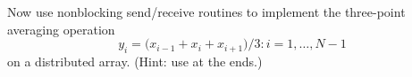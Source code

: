   \label{ex:3ptnonblock}
  Now use nonblocking send/receive routines to implement
  the three-point averaging operation
  \[ y_i=\bigl( x_{i-1}+x_i+x_{i+1} \bigr)/3\colon i=1,\ldots,N-1 \]
  on a distributed array. (Hint: use  at the ends.)
